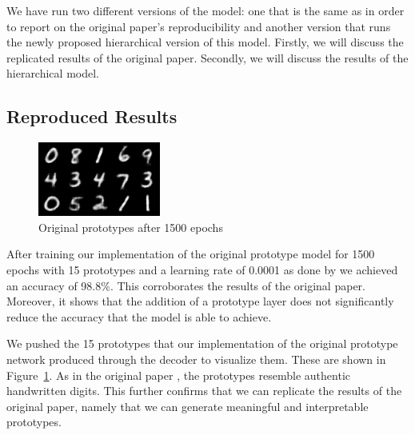 We have run two different versions of the model: one that is the same as \cite{li2018deep} in order to report on the original paper's reproducibility and another version that runs the newly proposed hierarchical version of this model. Firstly, we will discuss the replicated results of the original paper. Secondly, we will discuss the results of the hierarchical model.

\subsection{Reproduced Results}
\begin{figure}
    \centering
    \includegraphics{img/normalprot1499.png}
    \caption{Original prototypes after 1500 epochs}
    \label{normalprots}
\end{figure}

After training our implementation of the original prototype model for 1500 epochs with 15 prototypes and a learning rate of 0.0001 as done by \cite{li2018deep} we achieved an accuracy of 98.8\%. This corroborates the results of the original paper. Moreover, it shows that the addition of a prototype layer does not significantly reduce the accuracy that the model is able to achieve. 

We pushed the 15 prototypes that our implementation of the original prototype network produced through the decoder to visualize them. These are shown in Figure~\ref{normalprots}. As in the original paper \cite{li2018deep}, the prototypes resemble authentic handwritten digits. This further confirms that we can replicate the results of the original paper, namely that we can generate meaningful and interpretable prototypes.

